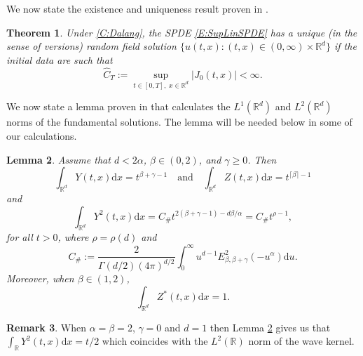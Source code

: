\documentclass[12pt]{report}
\theoremstyle{plain}
\newtheorem{theorem}{Theorem}[section]
\newtheorem{lemma}[theorem]{Lemma}
\theoremstyle{definition}
\newtheorem{remark}[theorem]{Remark}
\numberwithin{equation}{section}
\newcommand{\R}{\mathbb{R}}
\newcommand{\Norm}[1]{\left\|  #1   \right\|}
\newcommand{\ud}{\ensuremath{ \mathrm{d} }}
\begin{document}
We now state the existence and uniqueness result proven in \cite{chen.hu.ea:19:nonlinear}.

\begin{theorem}{\cite[Theorem 4.1]{chen.hu.ea:19:nonlinear}}
	\label{T:SolveabilityGenLip}
	Under \eqref{C:Dalang}, the SPDE \eqref{E:SupLinSPDE} has a unique (in the sense of versions) random field solution $\{u(t,x) : (t,x) \in (0,\infty) \times \R^d \}$ if the initial data are such that 
	\begin{equation} \label{E:HomogBdd}
	\widehat{C}_T := \sup_{t\in[0,T],\; x\in \R^d} |J_0(t,x)| < \infty.
	\end{equation}	
	
\end{theorem}

We now state a lemma proven in \cite{chen.hu.ea:19:nonlinear} that calculates the $L^1(\R^d)$ and $L^2(\R^d)$ norms of the fundamental solutions. The lemma will be needed below in some of our calculations.

\begin{lemma}{\cite[Theorem 4.1 and Lemma 5.5]{chen.hu.ea:19:nonlinear}}
	\label{L:1and2normYZ}
	Assume that $d < 2\alpha$, $\beta \in (0,2)$, and $\gamma \ge 0$. Then 
	\[
	\int_{\R^d} Y(t,x) \ud x = t^{\beta+\gamma -1 } \quad \text{and} \quad \int_{\R^d} Z(t,x) \ud x= t^{\lceil \beta \rceil -1}
	\]
	and
	\[
	\int_{\R^d} Y^2(t,x) \ud x = C_{\#} t^{2(\beta+\gamma-1)-d\beta/\alpha} = C_{\#} t^{\rho -1} ,
	\]
	for all $t > 0$, where $\rho = \rho(d)$ and 
	\[
	C_{\#} := \frac{2}{\Gamma(d/2)(4 \pi )^{d/2}} \int_0^\infty u^{d-1}E^2_{\beta,\beta + \gamma}(-u^\alpha) \ud u.
	\]
	Moreover, when $\beta \in (1,2)$,
	\[
	\int_{\R^d} Z^*(t,x) \ud x= 1. 
	\]
\end{lemma}
\begin{remark}
	When $\alpha = \beta = 2$,  $\gamma = 0$ and $d=1$ then Lemma \ref{L:1and2normYZ} gives us that $\int_{\R} Y^2(t,x) \ud x = t/2$ which coincides with the $L^2(\R)$ norm of the wave kernel. 
\end{remark}
\end{document}
